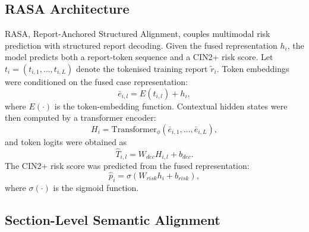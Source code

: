 \subsection{RASA Architecture}
\label{subsec:methods_rasa}

RASA, Report-Anchored Structured Alignment, couples multimodal risk prediction with structured report decoding. Given the fused representation \(h_i\), the model predicts both a report-token sequence and a CIN2+ risk score. Let \(t_i=(t_{i,1},\ldots,t_{i,L})\) denote the tokenised training report \(\tilde{r}_i\). Token embeddings were conditioned on the fused case representation:
\begin{equation}
\bar{e}_{i,l}=E(t_{i,l})+h_i,
\end{equation}
where \(E(\cdot)\) is the token-embedding function. Contextual hidden states were then computed by a transformer encoder:
\begin{equation}
H_i=\mathrm{Transformer}_{\phi}(\bar{e}_{i,1},\ldots,\bar{e}_{i,L}),
\end{equation}
and token logits were obtained as
\begin{equation}
\hat{T}_{i,l}=W_{dec}H_{i,l}+b_{dec}.
\end{equation}
The CIN2+ risk score was predicted from the fused representation:
\begin{equation}
\hat{p}_i=\sigma(W_{risk}h_i+b_{risk}),
\end{equation}
where \(\sigma(\cdot)\) is the sigmoid function.

\subsection{Section-Level Semantic Alignment}
\label{subsec:methods_section_alignment}

